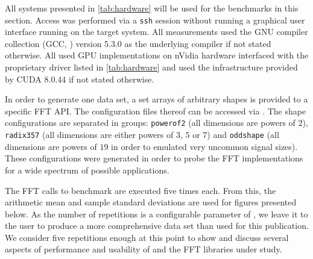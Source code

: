
All systems presented in \cref{tab:hardware} will be used for the benchmarks in this section. Access was performed via a \texttt{ssh} session without running a graphical user interface running on the target system. All measurements used the GNU compiler collection (GCC, \cite{stallman2001using}) version 5.3.0 as the underlying compiler if not stated otherwise. All used GPU implementations on nVidia hardware interfaced with the proprietary driver listed in \cref{tab:hardware} and used the infrastructure provided by CUDA $8.0.44$ if not stated otherwise. 

In order to generate one data set, a set arrays of arbitrary shapes is provided to a specific FFT API. The configuration files thereof can be accessed via \cite{gearshifft_github}. The shape configurations are separated in groups: \texttt{powerof2} (all dimensions are powers of $2$), \texttt{radix357} (all dimensions are either powers of $3$, $5$ or $7$) and \texttt{oddshape} (all dimensions are powers of $19$ in order to emulated very uncommon signal sizes). These configurations were generated in order to probe the FFT implementations for a wide spectrum of possible applications.  

The FFT calls to benchmark are executed five times each. From this, the arithmetic mean and sample standard deviations are used for figures presented below. As the number of repetitions is a configurable parameter of \gearshifft{}, we leave it to the user to produce a more comprehensive data set than used for this publication. We consider five repetitions enough at this point to show and discuss several aspects of performance and usability of \gearshifft{} and the FFT libraries under study.  

